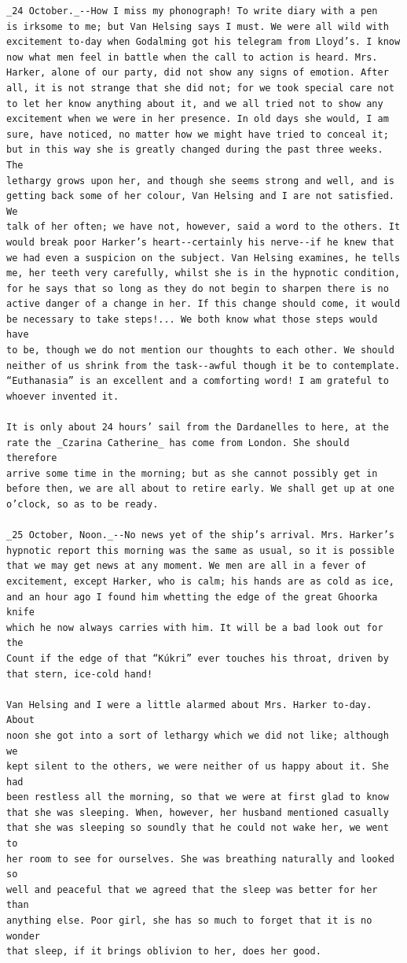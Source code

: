\documentclass{article}
\begin{document}
\begin{verbatim}
_24 October._--How I miss my phonograph! To write diary with a pen
is irksome to me; but Van Helsing says I must. We were all wild with
excitement to-day when Godalming got his telegram from Lloyd’s. I know
now what men feel in battle when the call to action is heard. Mrs.
Harker, alone of our party, did not show any signs of emotion. After
all, it is not strange that she did not; for we took special care not
to let her know anything about it, and we all tried not to show any
excitement when we were in her presence. In old days she would, I am
sure, have noticed, no matter how we might have tried to conceal it;
but in this way she is greatly changed during the past three weeks. The
lethargy grows upon her, and though she seems strong and well, and is
getting back some of her colour, Van Helsing and I are not satisfied. We
talk of her often; we have not, however, said a word to the others. It
would break poor Harker’s heart--certainly his nerve--if he knew that
we had even a suspicion on the subject. Van Helsing examines, he tells
me, her teeth very carefully, whilst she is in the hypnotic condition,
for he says that so long as they do not begin to sharpen there is no
active danger of a change in her. If this change should come, it would
be necessary to take steps!... We both know what those steps would have
to be, though we do not mention our thoughts to each other. We should
neither of us shrink from the task--awful though it be to contemplate.
“Euthanasia” is an excellent and a comforting word! I am grateful to
whoever invented it.

It is only about 24 hours’ sail from the Dardanelles to here, at the
rate the _Czarina Catherine_ has come from London. She should therefore
arrive some time in the morning; but as she cannot possibly get in
before then, we are all about to retire early. We shall get up at one
o’clock, so as to be ready.

_25 October, Noon._--No news yet of the ship’s arrival. Mrs. Harker’s
hypnotic report this morning was the same as usual, so it is possible
that we may get news at any moment. We men are all in a fever of
excitement, except Harker, who is calm; his hands are as cold as ice,
and an hour ago I found him whetting the edge of the great Ghoorka knife
which he now always carries with him. It will be a bad look out for the
Count if the edge of that “Kúkri” ever touches his throat, driven by
that stern, ice-cold hand!

Van Helsing and I were a little alarmed about Mrs. Harker to-day. About
noon she got into a sort of lethargy which we did not like; although we
kept silent to the others, we were neither of us happy about it. She had
been restless all the morning, so that we were at first glad to know
that she was sleeping. When, however, her husband mentioned casually
that she was sleeping so soundly that he could not wake her, we went to
her room to see for ourselves. She was breathing naturally and looked so
well and peaceful that we agreed that the sleep was better for her than
anything else. Poor girl, she has so much to forget that it is no wonder
that sleep, if it brings oblivion to her, does her good.


\end{verbatim}
\end{document}
